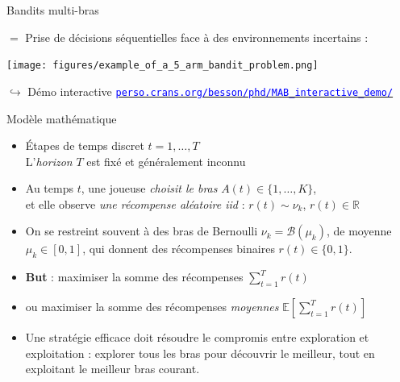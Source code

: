 \documentclass[11pt,french,ignorenonframetext,]{beamer}
\begin{document}
\begin{frame}{Bandits multi-bras}

  $=$ Prise de décisions séquentielles face à des environnements incertains :

  \begin{center}
    \texttt{[image: figures/example\_of\_a\_5\_arm\_bandit\_problem.png]}
  \end{center}

  \begin{tiny}
  $\hookrightarrow$ Démo interactive
    \href{https://perso.crans.org/besson/phd/MAB_interactive_demo/}{\textcolor{blue}{\texttt{perso.crans.org/besson/phd/MAB\_interactive\_demo/}}}
  \end{tiny}

\end{frame}


\begin{frame}{Modèle mathématique}

\begin{itemize}[<+->]
  \item
  Étapes de temps discret $t = 1, \dots, T$\\
  L'\emph{horizon} $T$ est fixé et généralement inconnu

  \item
  Au temps $t$, une joueuse \emph{choisit le bras} $A(t)\in\{1,\dots,K\}$,\\
  et elle observe \emph{une récompense aléatoire iid} : $r(t) \sim \nu_k$, $r(t)\in\mathbb{R}$

  \item
  On se restreint souvent à des bras de Bernoulli $\nu_k = \mathcal{B}(\mu_k)$, de moyenne $\mu_k\in[0,1]$,
  qui donnent des récompenses binaires $r(t) \in\{0,1\}$.

  \item
  \textbf{But} : maximiser la somme des récompenses $\sum\limits_{t=1}^T r(t)$

  \item
  ou \alert{maximiser la somme des récompenses \emph{moyennes} $\mathbb{E}\left[ \sum\limits_{t=1}^T r(t) \right]$}

  \item
  Une stratégie efficace doit résoudre le \alert{compromis entre exploration et exploitation} :
  explorer tous les bras pour découvrir le meilleur,
  tout en exploitant le meilleur bras courant.
\end{itemize}

\end{frame}
\end{document}
